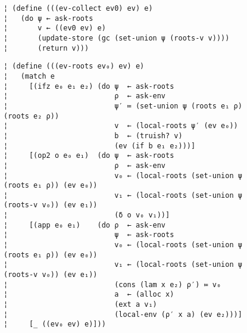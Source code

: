 \begin{figure} %
\begin{lstlisting}
¦ (define (((ev-collect ev0) ev) e)
¦   (do ψ ← ask-roots
¦       v ← ((ev0 ev) e)
¦       (update-store (gc (set-union ψ (roots-v v))))
¦       (return v)))
\end{lstlisting}
\figskip{}
\begin{lstlisting}
¦ (define (((ev-roots ev₀) ev) e)
¦   (match e
¦     [(ifz e₀ e₁ e₂) (do ψ  ← ask-roots
¦                         ρ  ← ask-env
¦                         ψ′ ≔ (set-union ψ (roots e₁ ρ) (roots e₂ ρ))
¦                         v  ← (local-roots ψ′ (ev e₀))
¦                         b  ← (truish? v)
¦                         (ev (if b e₁ e₂)))]
¦     [(op2 o e₀ e₁)  (do ψ  ← ask-roots
¦                         ρ  ← ask-env
¦                         v₀ ← (local-roots (set-union ψ (roots e₁ ρ)) (ev e₀))
¦                         v₁ ← (local-roots (set-union ψ (roots-v v₀)) (ev e₁))
¦                         (δ o v₀ v₁))]
¦     [(app e₀ e₁)    (do ρ  ← ask-env
¦                         ψ  ← ask-roots
¦                         v₀ ← (local-roots (set-union ψ (roots e₁ ρ)) (ev e₀))
¦                         v₁ ← (local-roots (set-union ψ (roots-v v₀)) (ev e₁))
¦                         (cons (lam x e₂) ρ′) ≔ v₀
¦                         a  ← (alloc x)
¦                         (ext a v₁)
¦                         (local-env (ρ′ x a) (ev e₂)))]
¦     [_ ((ev₀ ev) e)]))
\end{lstlisting}
\label{f:gc-collect-roots}
\end{figure} %

